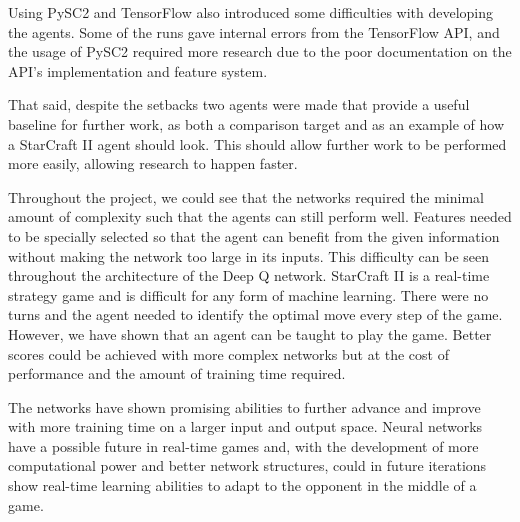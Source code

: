 Using PySC2 and TensorFlow also introduced some difficulties with developing the
agents. Some of the runs gave internal errors from the TensorFlow API, and the
usage of PySC2 required more research due to the poor documentation on the API's
implementation and feature system.

That said, despite the setbacks two agents were made that provide a useful
baseline for further work, as both a comparison target and as an example of how
a StarCraft II agent should look. This should allow further work to be performed
more easily, allowing research to happen faster.

Throughout the project, we could see that the networks required the minimal
amount of complexity such that the agents can still perform well. Features
needed to be specially selected so that the agent can benefit from the given
information without making the network too large in its inputs. This difficulty
can be seen throughout the architecture of the Deep Q network. StarCraft II is a
real-time strategy game and is difficult for any form of machine learning. There
were no turns and the agent needed to identify the optimal move every step of
the game. However, we have shown that an agent can be taught to play the game.
Better scores could be achieved with more complex networks but at the cost of
performance and the amount of training time required.

The networks have shown promising abilities to further advance and improve with
more training time on a larger input and output space. Neural networks have a
possible future in real-time games and, with the development of more
computational power and better network structures, could in future iterations
show real-time learning abilities to adapt to the opponent in the middle of a
game.
